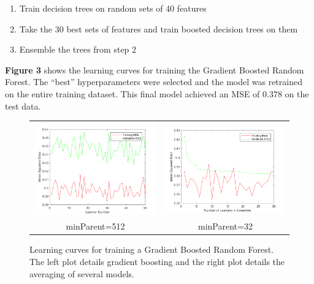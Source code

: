 \documentclass[12pt] {article}
\renewcommand{\baselinestretch}{1.3} %
\begin{document}
\begin{enumerate}
\item Train decision trees on random sets of 40 features
\item Take the 30 best sets of features and train boosted decision trees on them
\item Ensemble the trees from step 2
\end{enumerate}

\textbf{Figure 3} shows the learning curves for training the Gradient Boosted Random Forest. The ``best'' hyperparameters were selected and the model was retrained on the entire training dataset. This final model achieved an MSE of 0.378 on the test data.

\renewcommand{\baselinestretch}{1.0} %
\begin{figure}[h!] \centering
\begin{tabular}{cc}
\includegraphics[width=.45\textwidth]{figdir/learnerNumVersusMSE.png} &
\includegraphics[width=.45\textwidth]{figdir/numLearnersVersusMSE2.png} \\
minParent=512 & minParent=32 \\
\end{tabular}
\caption{Learning curves for training a Gradient Boosted Random Forest. The left plot details gradient boosting and the right plot details the averaging of several models.}
\end{figure}
\renewcommand{\baselinestretch}{1.3} %
\end{document}
